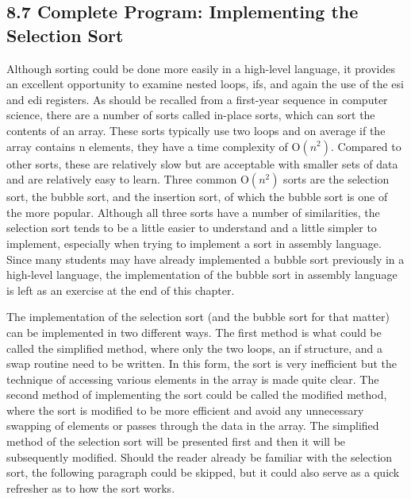 \documentclass[10pt]{article}
\begin{document}
\subsection*{8.7 Complete Program: Implementing the Selection Sort}
Although sorting could be done more easily in a high-level language, it provides an excellent opportunity to examine nested loops, ifs, and again the use of the esi and edi registers. As should be recalled from a first-year sequence in computer science, there are a number of sorts called in-place sorts, which can sort the contents of an array. These sorts typically use two loops and on average if the array contains n elements, they have a time complexity of $\mathrm{O}\left(n^{2}\right)$. Compared to other sorts, these are relatively slow but are acceptable with smaller sets of data and are relatively easy to learn. Three common $\mathrm{O}\left(n^{2}\right)$ sorts are the selection sort, the bubble sort, and the insertion sort, of which the bubble sort is one of the more popular. Although all three sorts have a number of similarities, the selection sort tends to be a little easier to understand and a little simpler to implement, especially when trying to implement a sort in assembly language. Since many students may have already implemented a bubble sort previously in a high-level language, the implementation of the bubble sort in assembly language is left as an exercise at the end of this chapter.

The implementation of the selection sort (and the bubble sort for that matter) can be implemented in two different ways. The first method is what could be called the simplified method, where only the two loops, an if structure, and a swap routine need to be written. In this form, the sort is very inefficient but the technique of accessing various elements in the array is made quite clear. The second method of implementing the sort could be called the modified method, where the sort is modified to be more efficient and avoid any unnecessary swapping of elements or passes through the data in the array. The simplified method of the selection sort will be presented first and then it will be subsequently modified. Should the reader already be familiar with the selection sort, the following paragraph could be skipped, but it could also serve as a quick refresher as to how the sort works.
\end{document}
